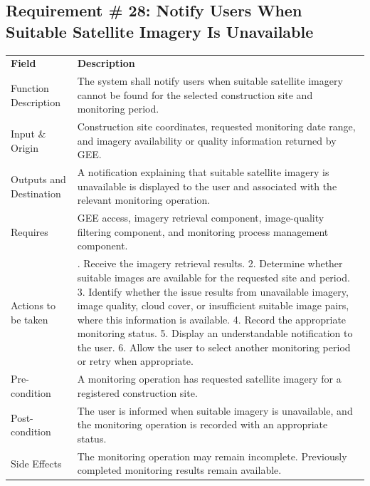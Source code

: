 \documentclass[12pt,a4paper]{report}
\begin{document}
\subsection{Requirement \# 28: Notify Users When Suitable Satellite
Imagery Is
Unavailable}\label{requirement-33-notify-users-when-suitable-satellite-imagery-is-unavailable}

\begin{longtable}[]{@{}
  >{\raggedright\arraybackslash}p{}
  >{\raggedright\arraybackslash}p{}@{}}
\toprule\noalign{}
\endhead
\bottomrule\noalign{}
\endlastfoot
\textbf{Field} & \textbf{Description} \\
Function Description & The system shall notify users when suitable
satellite imagery cannot be found for the selected construction site and
monitoring period. \\
Input \& Origin & Construction site coordinates, requested monitoring
date range, and imagery availability or quality information returned by
GEE. \\
Outputs and Destination & A notification explaining that suitable
satellite imagery is unavailable is displayed to the user and associated
with the relevant monitoring operation. \\
Requires & GEE access, imagery retrieval component, image-quality
filtering component, and monitoring process management component. \\
Actions to be taken & 1. Receive the imagery retrieval results. 2.
Determine whether suitable images are available for the requested site
and period. 3. Identify whether the issue results from unavailable
imagery, image quality, cloud cover, or insufficient suitable image
pairs, where this information is available. 4. Record the appropriate
monitoring status. 5. Display an understandable notification to the
user. 6. Allow the user to select another monitoring period or retry
when appropriate. \\
Pre-condition & A monitoring operation has requested satellite imagery
for a registered construction site. \\
Post-condition & The user is informed when suitable imagery is
unavailable, and the monitoring operation is recorded with an
appropriate status. \\
Side Effects & The monitoring operation may remain incomplete.
Previously completed monitoring results remain available. \\
\end{longtable}
\end{document}
